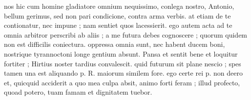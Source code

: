 


 nos hic cum homine gladiatore omnium nequissimo, conlega nostro, Antonio, bellum gerimus, sed non pari condicione, contra arma verbis. at etiam de te contionatur, nec impune ; nam sentiet quos lacessierit. ego autem acta ad te omnia arbitror perscribi ab aliis ; a me futura debes cognoscere ; quorum quidem non est difficilis coniectura. oppressa omnia sunt, nec habent ducem boni, nostrique tyrannoctoni longe gentium absunt. Pansa et sentit bene et loquitur fortiter ; Hirtius noster tardius convalescit. quid futurum sit plane nescio ; spes tamen una est aliquando p. R. maiorum similem fore. ego certe rei p. non deero et, quicquid acciderit a quo mea culpa absit, animo forti feram ; illud profecto, quoad potero, tuam famam et dignitatem tuebor.
